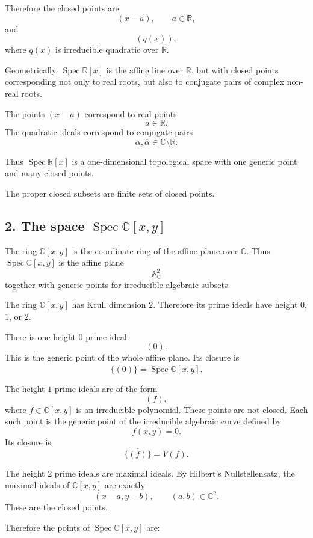 	Therefore the closed points are
	\[
	(x-a),
	\qquad a\in\mathbb R,
	\]
	and
	\[
	(q(x)),
	\]
	where \(q(x)\) is irreducible quadratic over \(\mathbb R\).
	
	Geometrically, \(\operatorname{Spec}\mathbb R[x]\) is the affine line over \(\mathbb R\), but
	with closed points corresponding not only to real roots, but also to conjugate
	pairs of complex non-real roots.
	
	The points \((x-a)\) correspond to real points
	\[
	a\in\mathbb R.
	\]
	The quadratic ideals correspond to conjugate pairs
	\[
	\alpha,\overline{\alpha}\in\mathbb C\setminus \mathbb R.
	\]
	
	Thus \(\operatorname{Spec}\mathbb R[x]\) is a one-dimensional topological space with one
	generic point and many closed points.
	
	The proper closed subsets are finite sets of closed points.
	
	\subsection*{2. The space \(\operatorname{Spec} \mathbb C[x,y]\)}
	
	The ring \(\mathbb C[x,y]\) is the coordinate ring of the affine plane over
	\(\mathbb C\). Thus \(\operatorname{Spec}\mathbb C[x,y]\) is the affine plane
	\[
	\mathbb A^2_{\mathbb C}
	\]
	together with generic points for irreducible algebraic subsets.
	
	The ring \(\mathbb C[x,y]\) has Krull dimension \(2\). Therefore its prime ideals
	have height \(0\), \(1\), or \(2\).
	
	There is one height \(0\) prime ideal:
	\[
	(0).
	\]
	This is the generic point of the whole affine plane. Its closure is
	\[
	\overline{\{(0)\}}=\operatorname{Spec}\mathbb C[x,y].
	\]
	
	The height \(1\) prime ideals are of the form
	\[
	(f),
	\]
	where \(f\in\mathbb C[x,y]\) is an irreducible polynomial. These points are not
	closed. Each such point is the generic point of the irreducible algebraic curve
	defined by
	\[
	f(x,y)=0.
	\]
	Its closure is
	\[
	\overline{\{(f)\}}=V(f).
	\]
	
	The height \(2\) prime ideals are maximal ideals. By Hilbert's Nullstellensatz,
	the maximal ideals of \(\mathbb C[x,y]\) are exactly
	\[
	(x-a,y-b),
	\qquad (a,b)\in\mathbb C^2.
	\]
	These are the closed points.
	
	Therefore the points of \(\operatorname{Spec}\mathbb C[x,y]\) are:
	
